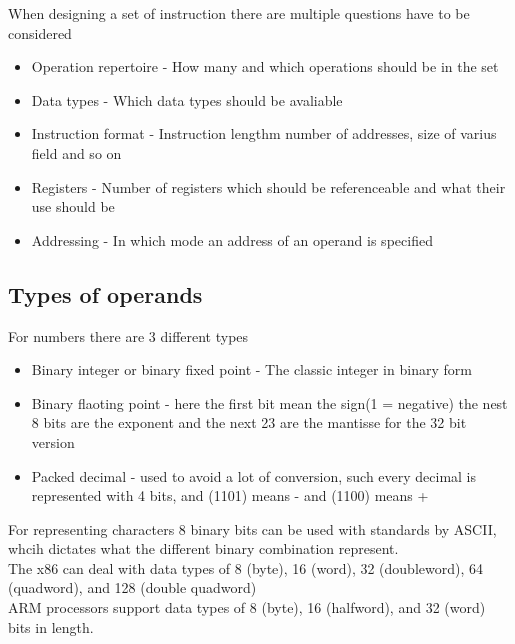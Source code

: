 \documentclass[12pt, a4paper]{article}
\begin{document}
			When designing a set of instruction there are multiple questions have to be considered
			\begin{itemize}
				\item Operation repertoire - How many and which operations should be in the set
				\item Data types - Which data types should be avaliable
				\item Instruction format - Instruction lengthm number of addresses, size of varius field and so on
				\item Registers - Number of registers which should be referenceable and what their use should be
				\item Addressing - In which mode an address of an operand is specified
			\end{itemize}
		\subsection{Types of operands}
			For numbers there are 3 different types 
			\begin{itemize}
				\item Binary integer or binary fixed point - The classic integer in binary form
				\item Binary flaoting point - here the first bit mean the sign(1 = negative) the nest 8 bits are the exponent and the next 23 are the mantisse for the 32 bit version
				\item Packed decimal - used to avoid a lot of conversion, such every decimal is represented with 4 bits, and (1101) means - and (1100) means +
			\end{itemize}
			For representing characters 8 binary bits can be used with standards by ASCII, whcih dictates what the different binary combination represent.\\
			The x86 can deal with data types of 8 (byte), 16 (word), 32 (doubleword), 64 (quadword), and 128 (double quadword)\\
			ARM processors support data types of 8 (byte), 16 (halfword), and 32 (word) bits in length.\\
\end{document}
